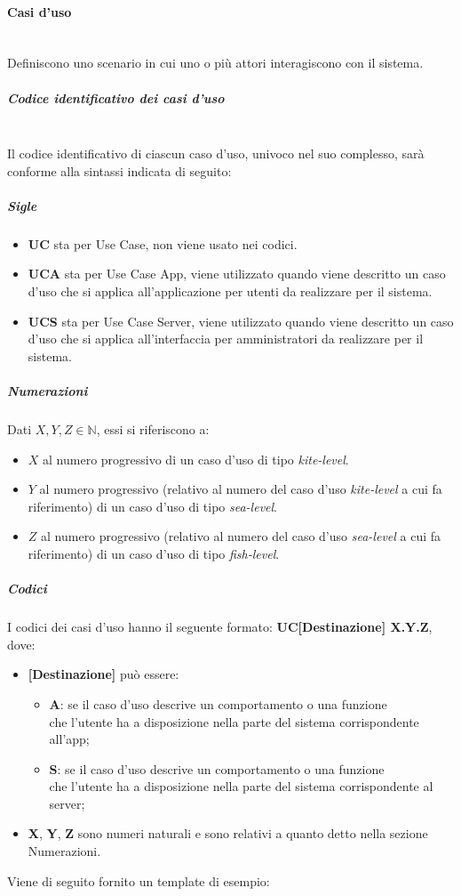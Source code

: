 \paragraph{Casi d'uso}\mbox{}\\
Definiscono uno scenario in cui uno o più attori interagiscono con il sistema.
\subparagraph{Codice identificativo dei casi d'uso}\mbox{}\\
Il codice identificativo di ciascun caso d’uso, univoco nel suo complesso, sarà conforme alla sintassi indicata di seguito:
\subparagraph{Sigle}
\begin{itemize}
	\item \textbf{UC} sta per Use Case, non viene usato nei codici.
	\item \textbf{UCA} sta per Use Case App, viene utilizzato quando viene descritto un caso d'uso che si applica all'applicazione per utenti da realizzare per il sistema.
	\item \textbf{UCS} sta per Use Case Server, viene utilizzato quando viene descritto un caso d'uso che si applica all'interfaccia per amministratori da realizzare per il sistema.
\end{itemize}

\subparagraph{Numerazioni}
Dati $X, Y, Z \in \mathbb{N}$, essi si riferiscono a:
\begin{itemize}
	\item $X$ al numero progressivo di un caso d'uso di tipo \textit{kite-level}.
	\item $Y$ al numero progressivo (relativo al numero del caso d'uso \textit{kite-level} a cui fa riferimento) di un caso d'uso di tipo \textit{sea-level}.
	\item $Z$ al numero progressivo (relativo al numero del caso d'uso \textit{sea-level} a cui fa riferimento) di un caso d'uso di tipo \textit{fish-level}.
\end{itemize}

\subparagraph{Codici}
I codici dei casi d'uso hanno il seguente formato: \textbf{UC[Destinazione] X.Y.Z}, dove:
\begin{itemize}
	\item \textbf{[Destinazione]} può essere:
		\begin{itemize}
			\item \textbf{A}: se il caso d’uso descrive un comportamento o una funzione \\che l’utente ha a disposizione nella parte del sistema corrispondente all’app;
			\item \textbf{S}: se il caso d’uso descrive un comportamento o una funzione \\che l’utente ha a disposizione nella parte del sistema corrispondente al server;
		\end{itemize}
	\item \textbf{X}, \textbf{Y}, \textbf{Z} sono numeri naturali e sono relativi a quanto detto nella sezione Numerazioni.
\end{itemize}
Viene di seguito fornito un template di esempio:

